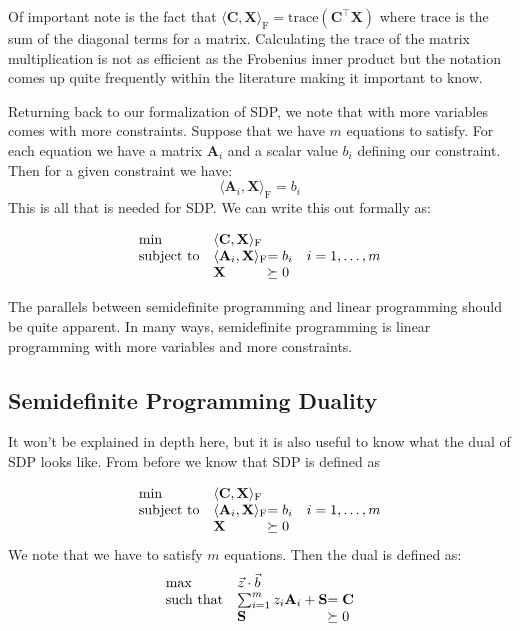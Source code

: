 \documentclass{article}
\begin{document}
Of important note is the fact that \( \langle \mathbf{C}, \mathbf{X} \rangle_{\mathrm{F}} = \text{trace}(\mathbf{C}^\top \mathbf{X}) \) where \( \text{trace} \) is the sum of the diagonal terms for a matrix. Calculating the \( \text{trace} \) of the matrix multiplication is not as efficient as the Frobenius inner product but the notation comes up quite frequently within the literature making it important to know.

Returning back to our formalization of SDP, we note that with more variables comes with more constraints. Suppose that we have \( m \) equations to satisfy. For each equation we have a matrix \( \mathbf{A}_i \) and a scalar value \( b_i \) defining our constraint. Then for a given constraint we have:
\[
\langle \mathbf{A}_i, \mathbf{X} \rangle_{\mathrm{F}} = b_i
\]
This is all that is needed for SDP. We can write this out formally as:

\begin{align*}
  \begin{array}{ll@{}ll}
  \min              & \langle \mathbf{C}, \mathbf{X} \rangle_{\mathrm{F}}                   & \\
  \text{subject to} & \langle \mathbf{A}_i, \mathbf{X} \rangle_{\mathrm{F}} &= b_i       & i=1 ,\dots, m\\
                    & \mathbf{X}                      &\succeq 0
  \end{array}
\end{align*}

The parallels between semidefinite programming and linear programming should be quite apparent.
In many ways, semidefinite programming is linear programming with more variables and more constraints.
\subsection{Semidefinite Programming Duality}
It won't be explained in depth here, but it is also useful to know what the dual of SDP looks like. From before we know that SDP is defined as

\begin{align*}
  \begin{array}{ll@{}ll}
  \min              & \langle \mathbf{C}, \mathbf{X} \rangle_{\mathrm{F}}                   & \\
  \text{subject to} & \langle \mathbf{A}_i, \mathbf{X} \rangle_{\mathrm{F}} &= b_i       & i=1 ,\dots, m\\
                    & \mathbf{X}                      &\succeq 0
  \end{array}
\end{align*}
We note that we have to satisfy \( m \) equations. Then the dual is defined as:
\begin{align*}
  \begin{array}{ll@{}ll}
    \max              & \vec{z} \cdot \vec{b}                              & \\
    \text{such that}  & \sum_{i=1}^m z_i \mathbf{A}_{i} + \mathbf{S} &= \mathbf{C} \\
                      & \mathbf{S}                      &\succeq 0
  \end{array}
\end{align*}
\end{document}
